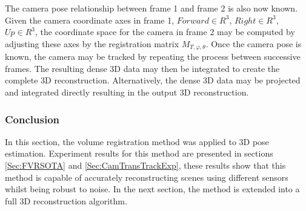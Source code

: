 The camera pose relationship between frame 1 and frame 2 is also now known. Given the camera coordinate axes in frame 1, $Forward \in R^3$, $Right \in R^3$, $Up \in R^3$, the coordinate space for the camera in frame 2 may be computed by adjusting these axes by the registration matrix $M_{T,\varphi,\theta}$. Once the camera pose is known, the camera may be tracked by repeating the process between successive frames. The resulting dense 3D data may then be integrated to create the complete 3D reconstruction. Alternatively, the dense 3D data may be projected and integrated directly resulting in the output 3D reconstruction. \\

\subsubsection{Conclusion}

In this section, the volume registration method was applied to 3D pose estimation. Experiment results for this method are presented in sections \ref{Sec:FVRSOTA} and \ref{Sec:CamTransTrackExp}, these results show that this method is capable of accurately reconstructing scenes using different sensors whilst being robust to noise. In the next section, the method is extended into a full 3D reconstruction algorithm.
